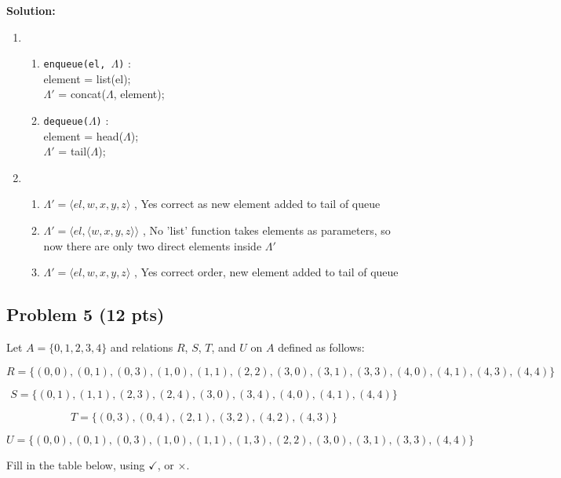 \documentclass[12pt]{article}
\begin{document}
\bigskip
\noindent \textbf{Solution:}
\begin{enumerate}
\item \begin{enumerate}
\item \texttt{enqueue(el, $\Lambda$)} : \\\hphantom{Spacer} element = list(el); \\ \hphantom{Spacer} $\Lambda'$ = concat($\Lambda$, element);
\item \texttt{dequeue($\Lambda$)} : \\\hphantom{Spacer} element = head($\Lambda$); \\\hphantom{Spacer} $\Lambda'$ = tail($\Lambda$);
\end{enumerate}
\item \begin{enumerate}
\item $\Lambda' = \langle el, w, x, y, z \rangle$ , Yes correct as new element added to tail of queue
\item $\Lambda' = \langle el, \langle w, x, y, z \rangle \rangle$ , No 'list' function takes elements as parameters, so now there are only two direct elements inside $\Lambda'$
\item $\Lambda' = \langle el, w, x, y, z \rangle$ , Yes correct order, new element added to tail of queue
\end{enumerate}
\end{enumerate}


\newpage

\subsection{Problem 5 (12 pts)}

\noindent Let $A = \{ 0, 1, 2, 3, 4 \}$ and relations $R$, $S$, $T$, and $U$ on $A$ defined as follows:

\[ R = \{ (0, 0),  (0, 1),  (0, 3),  (1, 0),  (1, 1),  (2, 2),  (3, 0),  (3, 1), (3, 3), (4, 0), (4, 1), (4, 3), (4, 4)  \}\]

\[ S = \{ (0, 1),  (1, 1),  (2, 3),  (2, 4), (3, 0), (3, 4), (4, 0), (4, 1), (4, 4)  \}\]

\[ T = \{ (0, 3), (0, 4),  (2, 1), (3, 2), (4, 2), (4, 3) \}\]

\[ U = \{ (0, 0),  (0, 1), (0, 3), (1, 0), (1, 1), (1, 3), (2, 2), (3, 0), (3, 1), (3, 3), (4, 4) \}\]

\noindent Fill in the table below, using $\checkmark$, or $\times$.
\end{document}
